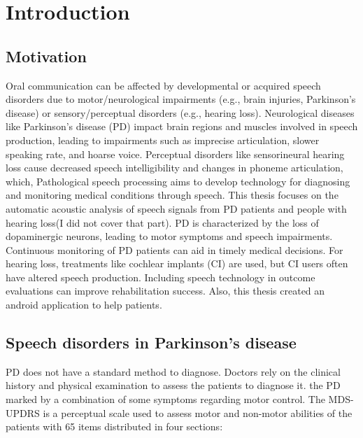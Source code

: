 \section{Introduction}
\subsection{Motivation}
Oral communication can be affected by developmental or acquired speech disorders due to motor/neurological impairments (e.g., brain injuries, Parkinson’s disease) or sensory/perceptual disorders (e.g., hearing loss).
Neurological diseases like Parkinson’s disease (PD) impact brain regions and muscles involved in speech production, leading to impairments such as imprecise articulation, slower speaking rate, and hoarse voice.
Perceptual disorders like sensorineural hearing loss cause decreased speech intelligibility and changes in phoneme articulation, which,
Pathological speech processing aims to develop technology for diagnosing and monitoring medical conditions through speech.
This thesis focuses on the automatic acoustic analysis of speech signals from PD patients and people with hearing loss(I did not cover that part).
PD is characterized by the loss of dopaminergic neurons, leading to motor symptoms and speech impairments.
Continuous monitoring of PD patients can aid in timely medical decisions.
For hearing loss, treatments like cochlear implants (CI) are used, but CI users often have altered speech production. Including speech technology in outcome evaluations can improve rehabilitation success.
Also, this thesis created an android application to help patients.
\subsection{Speech disorders in Parkinson’s disease}
PD does not have a standard method to diagnose. Doctors rely on the clinical history and physical examination to assess the patients to diagnose it. the PD marked by a combination of some symptoms regarding motor control.
The MDS-UPDRS \cite{Goetz2008} is a perceptual scale used to assess motor and non-motor abilities of the patients with 65 items distributed in four sections:

